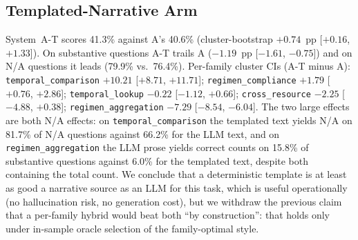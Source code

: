\subsection{Templated-Narrative Arm}
\label{sec:results:templated}

System~A-T scores 41.3\% against A's 40.6\% (cluster-bootstrap $+0.74$~pp
[$+0.16$, $+1.33$]).  On substantive questions A-T trails A ($-1.19$~pp [$-1.61$,
$-0.75$]) and on N/A questions it leads (79.9\% vs.\ 76.4\%).  Per-family cluster CIs
(A-T minus A): \texttt{temporal\_comparison} $+10.21$ [$+8.71$, $+11.71$];
\texttt{regimen\_compliance} $+1.79$ [$+0.76$, $+2.86$]; \texttt{temporal\_lookup}
$-0.22$ [$-1.12$, $+0.66$]; \texttt{cross\_resource} $-2.25$ [$-4.88$, $+0.38$];
\texttt{regimen\_aggregation} $-7.29$ [$-8.54$, $-6.04$].  The two large effects are
both N/A effects: on \texttt{temporal\_comparison} the templated text yields N/A on
81.7\% of N/A questions against 66.2\% for the LLM text, and on
\texttt{regimen\_aggregation} the LLM prose yields correct counts on 15.8\% of substantive
questions against 6.0\% for the templated text, despite both containing the total count.
We conclude that a deterministic template is at least as good a narrative source as an
LLM for this task, which is useful operationally (no hallucination risk, no generation
cost), but we withdraw the previous claim that a per-family hybrid would beat both ``by
construction'': that holds only under in-sample oracle selection of the family-optimal
style.
